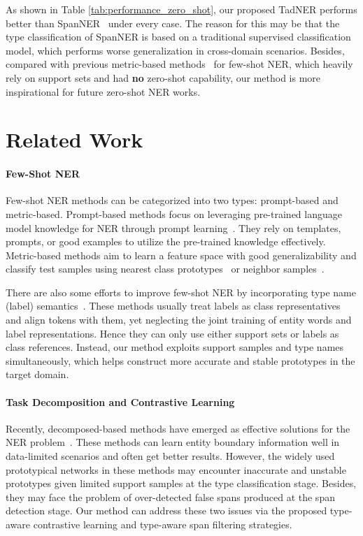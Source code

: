 \documentclass[11pt]{article}
\newcommand{\ours}{{TadNER}\xspace}
\begin{document}
As shown in Table \ref{tab:performance_zero_shot}, our proposed \ours performs better than SpanNER~\cite{wang2021learning-from-description} under every case.
The reason for this may be that the type classification of SpanNER is based on a traditional supervised classification model, which performs worse generalization in cross-domain scenarios.
Besides, compared with previous metric-based methods~\cite{das-etal-2022-container,ma-etal-2022-decomposed} for few-shot NER, which heavily rely on support sets and had \textbf{no} zero-shot capability, our method is more inspirational for future zero-shot NER works.


\section{Related Work}
\paragraph{Few-Shot NER}
Few-shot NER methods can be categorized into two types: prompt-based and metric-based.
Prompt-based methods focus on leveraging pre-trained language model knowledge for NER through prompt learning~\cite{cui-etal-2021-template,ma-etal-2022-template,huang-etal-2022-copner,lee-etal-2022-good}. 
They rely on templates, prompts, or good examples to utilize the pre-trained knowledge effectively.
Metric-based methods aim to learn a feature space with good generalizability and classify test samples using nearest class prototypes~\cite{snell_prototypical_2017,fritzler-2019,ji-etal-2022-shot,ma-etal-2022-decomposed} or neighbor samples~\cite{yang-katiyar-2020-simple,das-etal-2022-container}. 

There are also some efforts to improve few-shot NER by incorporating type name (label) semantics~\cite{hou-etal-2020-shot,ma2022label}. 
These methods usually treat labels as class representatives and align tokens with them, yet neglecting the joint training of entity words and label representations. 
Hence they can only use either support sets or labels as class references.
Instead, our method exploits support samples and type names simultaneously, which helps construct more accurate and stable prototypes in the target domain.

\paragraph{Task Decomposition and Contrastive Learning}
Recently, decomposed-based methods have emerged as effective solutions for the NER problem~\cite{shen-etal-2021-locate,wang2021learning-from-description,zhang2022exploring,wang-2022-enhanced,ma-etal-2022-decomposed}. 
These methods can learn entity boundary information well in data-limited scenarios and often get better results.
However, the widely used prototypical networks in these methods may encounter inaccurate and unstable prototypes given limited support samples at the type classification stage. 
Besides, they may face the problem of over-detected false spans produced at the span detection stage. 
Our method can address these two issues via the proposed type-aware contrastive learning and type-aware span filtering strategies.
\end{document}
